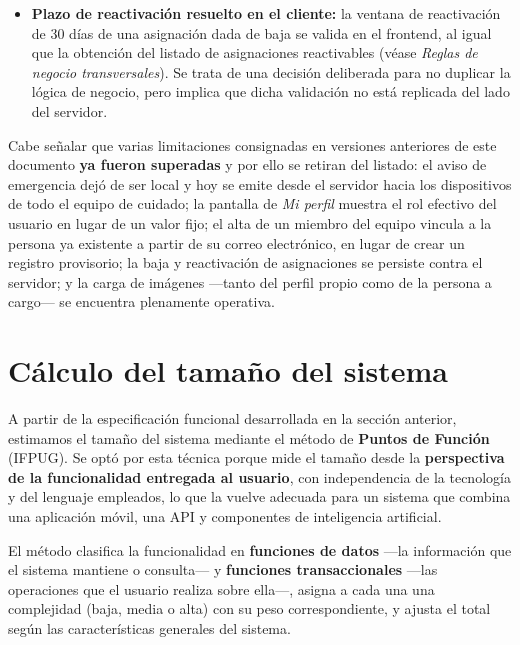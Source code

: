 \documentclass[a4paper,12pt]{article}
\begin{document}
\begin{itemize}
        \item \textbf{Plazo de reactivación resuelto en el cliente:} la ventana de reactivación de 30 días de una asignación dada de baja se valida en el frontend, al igual que la obtención del listado de asignaciones reactivables (véase \textit{Reglas de negocio transversales}). Se trata de una decisión deliberada para no duplicar la lógica de negocio, pero implica que dicha validación no está replicada del lado del servidor.
    \end{itemize}
    \par Cabe señalar que varias limitaciones consignadas en versiones anteriores de este documento \textbf{ya fueron superadas} y por ello se retiran del listado: el aviso de emergencia dejó de ser local y hoy se emite desde el servidor hacia los dispositivos de todo el equipo de cuidado; la pantalla de \textit{Mi perfil} muestra el rol efectivo del usuario en lugar de un valor fijo; el alta de un miembro del equipo vincula a la persona ya existente a partir de su correo electrónico, en lugar de crear un registro provisorio; la baja y reactivación de asignaciones se persiste contra el servidor; y la carga de imágenes —tanto del perfil propio como de la persona a cargo— se encuentra plenamente operativa.

    \newpage

    \section{Cálculo del tamaño del sistema}
    \par A partir de la especificación funcional desarrollada en la sección anterior, estimamos el tamaño del sistema mediante el método de \textbf{Puntos de Función} (IFPUG). Se optó por esta técnica porque mide el tamaño desde la \textbf{perspectiva de la funcionalidad entregada al usuario}, con independencia de la tecnología y del lenguaje empleados, lo que la vuelve adecuada para un sistema que combina una aplicación móvil, una API y componentes de inteligencia artificial.
    \par El método clasifica la funcionalidad en \textbf{funciones de datos} —la información que el sistema mantiene o consulta— y \textbf{funciones transaccionales} —las operaciones que el usuario realiza sobre ella—, asigna a cada una una complejidad (baja, media o alta) con su peso correspondiente, y ajusta el total según las características generales del sistema.
\end{document}
